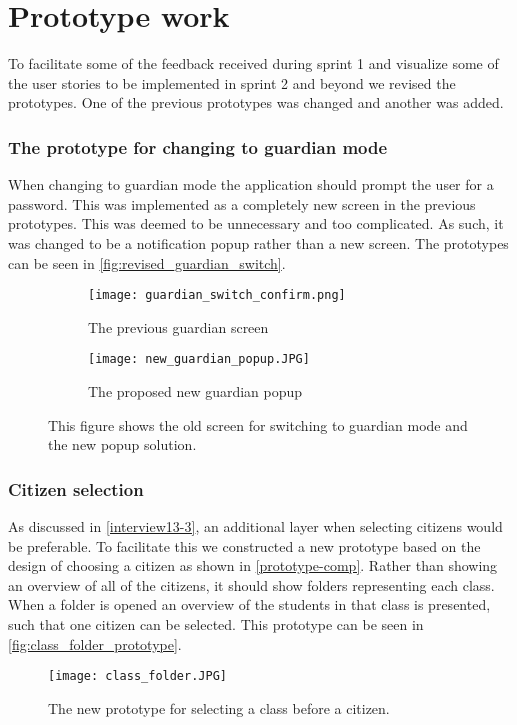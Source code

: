 \section{Prototype work}
To facilitate some of the feedback received during sprint 1 and visualize some of the user stories to be implemented in sprint 2 and beyond we revised the prototypes.
One of the previous prototypes was changed and another was added.

\subsubsection{The prototype for changing to guardian mode}
When changing to guardian mode the application should prompt the user for a password.
This was implemented as a completely new screen in the previous prototypes.
This was deemed to be unnecessary and too complicated.
As such, it was changed to be a notification popup rather than a new screen.
The prototypes can be seen in \autoref{fig:revised_guardian_switch}.

\begin{figure}[H]
    \begin{subfigure}{0.5\textwidth}
    \texttt{[image: guardian\_switch\_confirm.png]} 
    \caption{The previous guardian screen}
    \label{fig:previous_guardian_screen}
    \end{subfigure}
    \begin{subfigure}{0.5\textwidth}
        \texttt{[image: new\_guardian\_popup.JPG]}
    \caption{The proposed new guardian popup}
    \label{fig:new_guardian_popup}
    \end{subfigure} 
    \caption{This figure shows the old screen for switching to guardian mode and the new popup solution.}
    \label{fig:revised_guardian_switch}
\end{figure}

\subsubsection{Citizen selection}
As discussed in \autoref{interview13-3}, an additional layer when selecting citizens would be preferable.
To facilitate this we constructed a new prototype based on the design of choosing a citizen as shown in \autoref{prototype-comp}.
Rather than showing an overview of all of the citizens, it should show folders representing each class.
When a folder is opened an overview of the students in that class is presented, such that one citizen can be selected.
This prototype can be seen in \autoref{fig:class_folder_prototype}.

\begin{figure}[H]
    \centering
    \texttt{[image: class\_folder.JPG]}
    \caption{The new prototype for selecting a class before a citizen.}
    \label{fig:class_folder_prototype}
  \end{figure}
